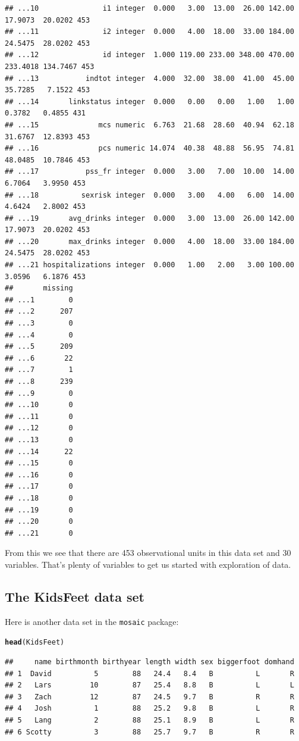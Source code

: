 \documentclass[twoside]{book}\usepackage[]{graphicx}\usepackage[]{xcolor}
\makeatletter
\newcommand{\hlstd}[1]{\textcolor[rgb]{0.345,0.345,0.345}{#1}}%
\newcommand{\hlkwd}[1]{\textcolor[rgb]{0.737,0.353,0.396}{\textbf{#1}}}%
\newenvironment{kframe}{%
 \def\at@end@of@kframe{}%
 \ifinner\ifhmode%
  \def\at@end@of@kframe{\end{minipage}}%
  \begin{minipage}{\columnwidth}%
 \fi\fi%
 \def\FrameCommand##1{\hskip\@totalleftmargin \hskip-\fboxsep
 \colorbox{shadecolor}{##1}\hskip-\fboxsep
     \hskip-\linewidth \hskip-\@totalleftmargin \hskip\columnwidth}%
 \MakeFramed {\advance\hsize-\width
   \@totalleftmargin\z@ \linewidth\hsize
   \@setminipage}}%
 {\par\unskip\endMakeFramed%
 \at@end@of@kframe}
\newenvironment{knitrout}{}{} %
\newcommand{\Rindex}[1]{\index{\texttt{#1}}}
\newcommand{\pkg}[1]{{\color{red!80!black}\texttt{#1}}\Rindex{#1}}
\makeatother
\begin{document}
\begin{knitrout}
\begin{kframe}
\begin{verbatim}
## ...10               i1 integer  0.000   3.00  13.00  26.00 142.00  17.9073  20.0202 453
## ...11               i2 integer  0.000   4.00  18.00  33.00 184.00  24.5475  28.0202 453
## ...12               id integer  1.000 119.00 233.00 348.00 470.00 233.4018 134.7467 453
## ...13           indtot integer  4.000  32.00  38.00  41.00  45.00  35.7285   7.1522 453
## ...14       linkstatus integer  0.000   0.00   0.00   1.00   1.00   0.3782   0.4855 431
## ...15              mcs numeric  6.763  21.68  28.60  40.94  62.18  31.6767  12.8393 453
## ...16              pcs numeric 14.074  40.38  48.88  56.95  74.81  48.0485  10.7846 453
## ...17           pss_fr integer  0.000   3.00   7.00  10.00  14.00   6.7064   3.9950 453
## ...18          sexrisk integer  0.000   3.00   4.00   6.00  14.00   4.6424   2.8002 453
## ...19       avg_drinks integer  0.000   3.00  13.00  26.00 142.00  17.9073  20.0202 453
## ...20       max_drinks integer  0.000   4.00  18.00  33.00 184.00  24.5475  28.0202 453
## ...21 hospitalizations integer  0.000   1.00   2.00   3.00 100.00   3.0596   6.1876 453
##       missing
## ...1        0
## ...2      207
## ...3        0
## ...4        0
## ...5      209
## ...6       22
## ...7        1
## ...8      239
## ...9        0
## ...10       0
## ...11       0
## ...12       0
## ...13       0
## ...14      22
## ...15       0
## ...16       0
## ...17       0
## ...18       0
## ...19       0
## ...20       0
## ...21       0
\end{verbatim}
\end{kframe}
\end{knitrout}

From this we see that there are 453 observational
units in this data set and 30 variables.
That's plenty of variables to get us started with exploration of data.

\subsection{The KidsFeet data set}
Here is another data set in the \pkg{mosaic} package:
\begin{knitrout}
\color{fgcolor}\begin{kframe}
\begin{alltt}
\hlkwd{head}\hlstd{(KidsFeet)}
\end{alltt}
\begin{verbatim}
##     name birthmonth birthyear length width sex biggerfoot domhand
## 1  David          5        88   24.4   8.4   B          L       R
## 2   Lars         10        87   25.4   8.8   B          L       L
## 3   Zach         12        87   24.5   9.7   B          R       R
## 4   Josh          1        88   25.2   9.8   B          L       R
## 5   Lang          2        88   25.1   8.9   B          L       R
## 6 Scotty          3        88   25.7   9.7   B          R       R
\end{verbatim}
\end{kframe}
\end{knitrout}
\end{document}
